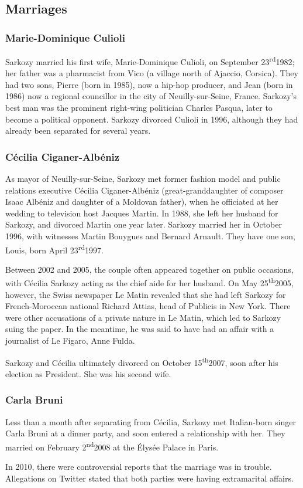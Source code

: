 \documentclass[11pt;a4paper]{article}
\newcommand{\theu}[0]{\textsuperscript{th}}
\newcommand{\nd}[0]{\textsuperscript{nd}}
\newcommand{\rd}[0]{\textsuperscript{rd}}
\begin{document}
\newpage

\subsection*{Marriages}
\subsubsection*{Marie-Dominique Culioli}

Sarkozy married his first wife, Marie-Dominique Culioli, on September 23\rd 1982; her father was a pharmacist from Vico (a village north of Ajaccio, Corsica). They had two sons, Pierre (born in 1985), now a hip-hop producer, and Jean (born in 1986) now a regional councillor in the city of Neuilly-sur-Seine, France. Sarkozy's best man was the prominent right-wing politician Charles Pasqua, later to become a political opponent. Sarkozy divorced Culioli in 1996, although they had already been separated for several years.

\subsubsection*{Cécilia Ciganer-Albéniz}

As mayor of Neuilly-sur-Seine, Sarkozy met former fashion model and public relations executive Cécilia Ciganer-Albéniz (great-granddaughter of composer Isaac Albéniz and daughter of a Moldovan father), when he officiated at her wedding to television host Jacques Martin. In 1988, she left her husband for Sarkozy, and divorced Martin one year later. Sarkozy married her in October 1996, with witnesses Martin Bouygues and Bernard Arnault. They have one son, Louis, born April 23\rd 1997.

Between 2002 and 2005, the couple often appeared together on public occasions, with Cécilia Sarkozy acting as the chief aide for her husband. On May 25\theu 2005, however, the Swiss newspaper Le Matin revealed that she had left Sarkozy for French-Moroccan national Richard Attias, head of Publicis in New York. There were other accusations of a private nature in Le Matin, which led to Sarkozy suing the paper. In the meantime, he was said to have had an affair with a journalist of Le Figaro, Anne Fulda.

Sarkozy and Cécilia ultimately divorced on October 15\theu 2007, soon after his election as President. She was his second wife.

\subsubsection*{Carla Bruni}

Less than a month after separating from Cécilia, Sarkozy met Italian-born singer Carla Bruni at a dinner party, and soon entered a relationship with her. They married on February 2\nd 2008 at the Élysée Palace in Paris.

In 2010, there were controversial reports that the marriage was in trouble. Allegations on Twitter stated that both parties were having extramarital affairs.
\end{document}
